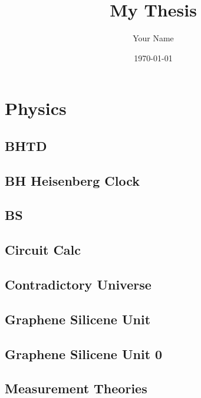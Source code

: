 \documentclass{report}
\title{My Thesis}
\author{Your Name}
\date{\today}
\begin{document}
\maketitle

\tableofcontents

\part{Physics}

\chapter{BHTD}

\chapter{BH Heisenberg Clock}

\chapter{BS}

\chapter{Circuit Calc}

\chapter{Contradictory Universe}

\chapter{Graphene Silicene Unit}

\chapter{Graphene Silicene Unit 0}

\chapter{Measurement Theories}
\end{document}
